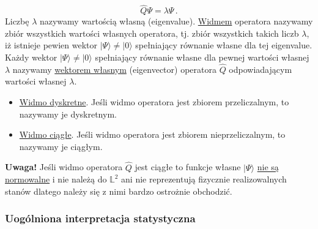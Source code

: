 \documentclass{myclass}
\begin{document}
\begin{equation*}
\hat{Q}\Psi=\lambda\Psi\,.
\end{equation*}
Liczbę \(\lambda\) nazywamy wartością własną (eigenvalue). \underline{Widmem} operatora nazywamy
zbiór wszystkich wartości własnych operatora, tj.  zbiór wszystkich takich liczb \(\lambda\), iż
istnieje pewien wektor \(|\Psi\rangle\neq|0\rangle\) spełniający równanie własne dla tej eigenvalue.
Każdy wektor \(|\Psi\rangle\neq |0\rangle\) spełniający równanie własne dla pewnej wartości własnej
\(\lambda\) nazywamy \underline{wektorem własnym} (eigenvector) operatora \(\hat{Q}\) odpowiadającym
wartości własnej \(\lambda\).

\begin{itemize}

\item \underline{Widmo dyskretne}. Jeśli widmo operatora jest zbiorem przeliczalnym, to nazywamy je
dyskretnym.

\item \underline{Widmo ciągłe}. Jeśli widmo operatora jest zbiorem nieprzeliczalnym, to nazywamy je
ciągłym.

\end{itemize}

\textbf{Uwaga!} Jeśli widmo operatora \(\hat{Q}\) jest ciągłe to funkcje własne \(|\Psi\rangle\)
\underline{nie są normowalne} i nie należą do \(\mathbb{L}^2\) ani nie reprezentują fizycznie
realizowalnych stanów dlatego należy się z nimi bardzo ostrożnie obchodzić.

\label{postulat2}\subsubsection{Uogólniona interpretacja statystyczna} \noindent{}\\
\end{document}
